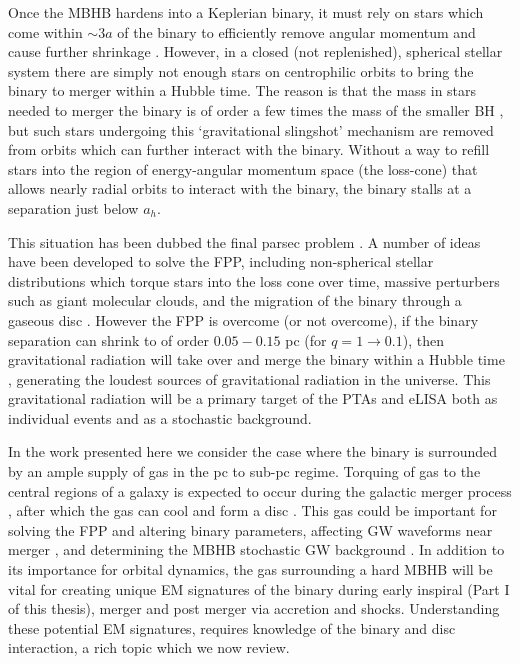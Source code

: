 Once the MBHB hardens into a Keplerian binary, it must rely on stars which
come within $\sim3a$ of the binary to efficiently remove angular momentum and
cause further shrinkage \citep{Saslaw:1974}. However, in a closed (not
replenished),  spherical stellar system there are simply not enough stars on
centrophilic orbits to bring the binary to merger within a Hubble time. The
reason is that the mass in stars needed to merger the binary is of order a few
times the mass of the smaller BH \citep{MerrittMilos:2005:LRR}, but such stars undergoing this
`gravitational slingshot' mechanism are removed from orbits which can further
interact with the binary. Without a way to refill stars into the region of
energy-angular momentum space (the loss-cone) that allows nearly radial orbits
to interact with the binary, the binary stalls at a separation just below
$a_h$.

This situation has been dubbed the final parsec problem
\citep[FPP][]{Milosavljevic:2003:FPcP}. A number of ideas have been developed
to solve the FPP, including non-spherical stellar distributions which torque
stars into the loss cone over time, massive perturbers such as giant molecular
clouds, and the migration of the binary through a gaseous disc
\citep{GouldRix:2000, ArmNat:2002:ApJL, Mayer:2013:MBHBGasRev, Goicovic:2016}.
However the FPP is overcome (or not overcome), if the binary separation can
shrink to of order $0.05-0.15$ pc (for $q=1 \rightarrow 0.1$), then
gravitational radiation will take over and merge the binary within a Hubble
time \citep{Peters64}, generating the loudest sources of gravitational
radiation in the universe. This gravitational radiation will be a primary
target of the PTAs and eLISA both as individual events and as a stochastic
background.

In the work presented here we consider the case where the binary is surrounded
by an ample supply of gas in the pc to sub-pc regime. Torquing of gas to the
central regions of a galaxy is expected to occur during the galactic merger
process \citep{BH1992, Barnes:1996}, after which the gas can cool and form a
disc \citep{Barnes:2002}. This gas could be important for solving the FPP and
altering binary parameters, affecting GW waveforms near merger
\citep[\textit{e.g.}][]{ArmNat:2005, YKH:2011:L, RoedigSesana:2012:eccGWs},
%
and determining the MBHB stochastic GW
background \citep{KocsisSesana:2011, Shannon:2015,
Sesana+2016:GWB, EPTA:GWB:2015, Arzoumanian:2015:SGWB}. In addition to its
importance for orbital dynamics, the gas surrounding a hard MBHB will be vital
for creating unique EM signatures of the binary during early inspiral (Part I
of this thesis), merger \citep{Chang:2010, Baruteau:2012,
CerioliLodato:Squeeze:2016} and post merger \citep{Lippai:2008, Lia10,
Rossi:2010, Ponce:2012, Rosotti:2012, Zanotti:2012} via accretion and shocks.
Understanding these potential EM signatures, requires knowledge of the binary
and disc interaction, a rich topic which we now review.




